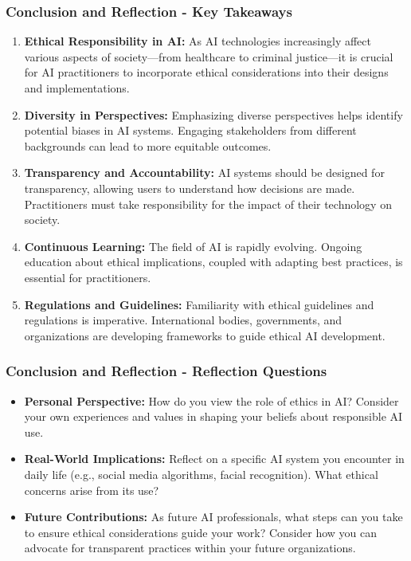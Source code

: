 \documentclass{beamer}
\begin{document}
\begin{frame}[fragile]
    \frametitle{Conclusion and Reflection - Key Takeaways}
    \begin{enumerate}
        \item \textbf{Ethical Responsibility in AI:} 
        As AI technologies increasingly affect various aspects of society—from healthcare to criminal justice—it is crucial for AI practitioners to incorporate ethical considerations into their designs and implementations.

        \item \textbf{Diversity in Perspectives:} 
        Emphasizing diverse perspectives helps identify potential biases in AI systems. Engaging stakeholders from different backgrounds can lead to more equitable outcomes.

        \item \textbf{Transparency and Accountability:} 
        AI systems should be designed for transparency, allowing users to understand how decisions are made. Practitioners must take responsibility for the impact of their technology on society.

        \item \textbf{Continuous Learning:} 
        The field of AI is rapidly evolving. Ongoing education about ethical implications, coupled with adapting best practices, is essential for practitioners.

        \item \textbf{Regulations and Guidelines:} 
        Familiarity with ethical guidelines and regulations is imperative. International bodies, governments, and organizations are developing frameworks to guide ethical AI development.
    \end{enumerate}
\end{frame}

\begin{frame}[fragile]
    \frametitle{Conclusion and Reflection - Reflection Questions}
    \begin{itemize}
        \item \textbf{Personal Perspective:} 
        How do you view the role of ethics in AI? Consider your own experiences and values in shaping your beliefs about responsible AI use.

        \item \textbf{Real-World Implications:} 
        Reflect on a specific AI system you encounter in daily life (e.g., social media algorithms, facial recognition). What ethical concerns arise from its use? 

        \item \textbf{Future Contributions:} 
        As future AI professionals, what steps can you take to ensure ethical considerations guide your work? Consider how you can advocate for transparent practices within your future organizations.
    \end{itemize}
\end{frame}
\end{document}
